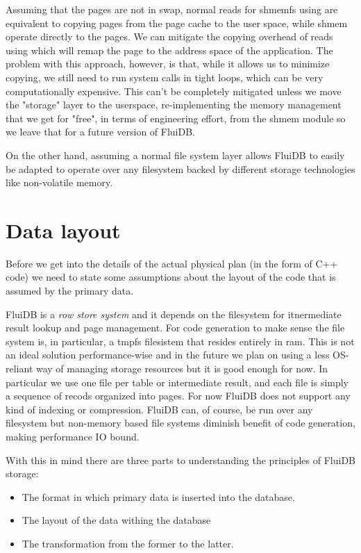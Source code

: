Assuming that the pages are not in swap, normal reads for shmemfs
using  are equivalent to copying pages from the page cache to
the user space, while shmem operate directly to
the pages. We can mitigate the copying overhead of reads using 
which will remap the page to the address space of the application. 
The problem with this approach, however, is that, while it allows us to minimize
copying, we still need to run system calls in tight loops, which can
be very computationally expensive. This can't be completely mitigated
unless we move the "storage" layer to the userspace, re-implementing
the memory management that we get for "free", in terms of engineering
effort, from the shmem module so we leave that for a future version of
FluiDB.

On the other hand, assuming a normal file system layer allows  FluiDB to easily be adapted to
operate over any filesystem backed by different storage technologies
like non-volatile memory.

\section{Data layout}

Before we get into the details of the actual physical plan (in the
form of C++ code) we need to state some assumptions about the layout
of the code that is assumed by the primary data.

FluiDB is a \emph{row store system} and it depends on the filesystem
for itnermediate result lookup and page management. For code
generation to make sense the file system is, in particular, a tmpfs
filesistem that resides entirely in ram. This is not an ideal solution
performance-wise and in the future we plan on using a less OS-reliant
way of managing storage resources but it is good enough for now. In
particular we use one file per table or intermediate result, and each
file is simply a sequence of recods organized into pages. For now
FluiDB does not support any kind of indexing or compression. FluiDB
can, of course, be run over any filesystem but non-memory based file
systems diminish benefit of code generation, making performance IO
bound.

With this in mind there are three parts to understanding the
principles of FluiDB storage:

\begin{itemize}
\item The format in which primary data is inserted into the database.
\item The layout of the data withing the database
\item The transformation from the former to the latter.
\end{itemize}


